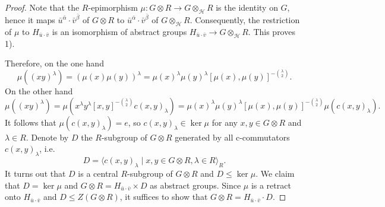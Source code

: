 \documentclass[11pt]{article}
\theoremstyle{definition}
\begin{document}
\begin{proof}
	Note that the $R$-epimorphism $\mu: G\otimes R \to G \otimes_{\mathcal{H}} R$ is the identity on $G$, hence it maps $\bar u^{\bar\alpha} \cdot \bar v^{\bar \beta}$ of $G \otimes R$ to $\bar u^{\bar\alpha} \cdot \bar v^{\bar \beta}$ of $G \otimes_{\mathcal{H}} R$. Consequently, the restriction of $\mu$ to $H_{\bar u \cdot \bar v}$ is an isomorphism of abstract groups $H_{\bar u \cdot \bar v} \to G \otimes_{\mathcal{H}} R$. This proves 1).
	
	
	Therefore, on the one hand
	$$
	\mu((xy)^\lambda) = (\mu(x)\mu(y))^\lambda= \mu(x)^\lambda \mu(y)^\lambda [\mu(x),\mu(y)]^{-\binom{\lambda}{2}}.
	$$
	On the other hand
	$$
	\mu((xy)^\lambda) = \mu(x^\lambda y^\lambda [x,y]^{-\binom{\lambda}{2}} c(x,y)_\lambda)= \mu(x)^\lambda \mu(y)^\lambda [\mu(x),\mu(y)]^{-\binom{\lambda}{2}} \mu(c(x,y)_\lambda).
	$$
	It follows that $\mu(c(x,y)_\lambda) = e$, so $c(x,y)_\lambda \in \ker \mu$ for any $x,y \in G\otimes R$ and $\lambda \in R$.
    Denote by $D$ the $R$-subgroup of $G \otimes R$ generated by all c-commutators $c(x,y)_\lambda$, i.e.
	$$
	D = \langle c(x,y)_\lambda \mid x,y \in G\otimes R, \lambda \in R\rangle_R.
	$$
	It turns out that $D$ is a central $R$-subgroup of $G \otimes R$ and $D \leq \ker \mu$.
    We claim that $D = \ker \mu$ and $G\otimes R = H_{\bar u \cdot \bar v} \times D$ as abstract groups. Since $\mu$ is a retract onto $H_{\bar u \cdot \bar v}$ and $D \leq Z(G\otimes R)$, it suffices to show that $G\otimes R = H_{\bar u \cdot \bar v}\cdot D$.
	

\end{proof}
\end{document}
